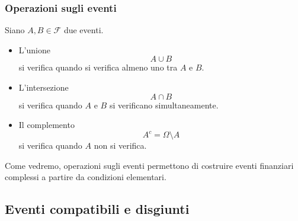 \documentclass[handout]{beamer}%
\newenvironment{stepitemize}{\begin{itemize}[<+->]}{\end{itemize} }
\providecommand{\F}{\mathcal{F}}
\providecommand{\1}{\mathbf{1}}
\providecommand{\QTR}[2]{\csname #1\endcsname{#2}}
\begin{document}
\begin{frame}%
%

\frametitle{Operazioni sugli eventi}%


Siano $A,B\in\F$ due eventi.

\medskip

\begin{stepitemize}
\item L'unione
\[
A\cup B
\]
si verifica quando si verifica almeno uno tra $A$ e $B$.

\item L'intersezione
\[
A\cap B
\]
si verifica quando $A$ e $B$ si verificano simultaneamente.

\item Il complemento
\[
A^{c}=\Omega\setminus A
\]
si verifica quando $A$ non si verifica.
\end{stepitemize}

\medskip

\begin{center}
{\small Come vedremo, operazioni sugli eventi permettono di costruire eventi
finanziari complessi a partire da condizioni elementari.}
\end{center}%

\transboxout
\end{frame}%




\subsection{Eventi compatibili e disgiunti}%
\end{document}
